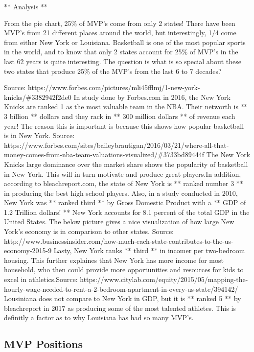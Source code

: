 \documentclass[11pt]{article}
\begin{document}
    ** Analysis **

From the pie chart, 25\% of MVP's come from only 2 states! There have
been MVP's from 21 different places around the world, but interestingly,
1/4 come from either New York or Louisiana. Basketball is one of the
most popular sports in the world, and to know that only 2 states account
for 25\% of MVP's in the last 62 years is quite interesting. The
question is what is so special about these two states that produce 25\%
of the MVP's from the last 6 to 7 decades?

 Source:
https://www.forbes.com/pictures/mli45fflmj/1-new-york-knicks/\#3382942f2de0
In study done by Forbes.com in 2016, the New York Knicks are ranked 1 as
the most valuable team in the NBA. Their networth is ** 3 billion **
dollars and they rack in ** 300 million dollars ** of revenue each year!
The reason this is important is because this shows how popular
basketball is in New York. Source:
https://www.forbes.com/sites/baileybrautigan/2016/03/21/where-all-that-money-comes-from-nba-team-valuations-visualized/\#3733bd89444f
The New York Knicks large dominance over the market share shows the
popularity of basketball in New York. This will in turn motivate and
produce great players.In addition, according to bleachreport.com, the
state of New York is ** ranked number 3 ** in producing the best high
school players. Also, in a study conducted in 2010, New York was **
ranked third ** by Gross Domestic Product with a ** GDP of 1.2 Trillion
dollars! ** New York accounts for 8.1 percent of the total GDP in the
United States. The below picture gives a nice visualization of how large
New York's economy is in comparison to other states. Source:
http://www.businessinsider.com/how-much-each-state-contributes-to-the-us-economy-2015-9
Lasty, New York ranks ** third ** in incomer per two-bedroom housing.
This further explaines that New York has more income for most household,
who then could provide more opportunities and resources for kids to
excel in athletics.Source:
https://www.citylab.com/equity/2015/05/mapping-the-hourly-wage-needed-to-rent-a-2-bedroom-apartment-in-every-us-state/394142/
Lousiniana does not compare to New York in GDP, but it is ** ranked 5 **
by bleachreport in 2017 as producing some of the most talented athletes.
This is definitly a factor as to why Louisiana has had so many MVP's. 

    \subsection{MVP Positions}\label{mvp-positions}
\end{document}
